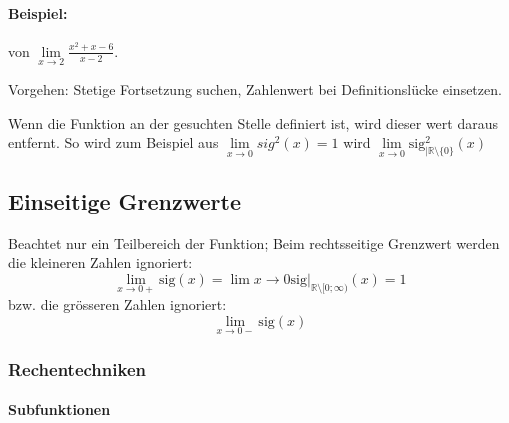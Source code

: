 \paragraph{Beispiel:} von $\lim\limits_{x \to 2}{\frac{x^2 + x -6}{x-2}}$.

Vorgehen: Stetige Fortsetzung suchen, Zahlenwert bei Definitionslücke  einsetzen.


Wenn die Funktion an der gesuchten Stelle definiert ist, wird dieser wert daraus entfernt. So wird zum Beispiel aus $\lim\limits_{x \to 0}{sig^2(x)} = 1$ wird $\lim\limits_{x \to 0}{\text{sig}^2_{|\mathbb{R} \setminus \{0\}}(x)}$

\subsection{Einseitige Grenzwerte}

	Beachtet nur ein Teilbereich der Funktion; Beim rechtsseitige Grenzwert werden die kleineren Zahlen ignoriert:
\[
	\lim\limits_{x \to 0+}{\text{sig}(x)} = \lim\limits{x \to 0} \text{sig}|_{\mathbb{R} \setminus [0;\infty)}(x) = 1
\]
bzw. die grösseren Zahlen ignoriert:
\[
	\lim\limits_{x \to 0-}{\text{sig}(x)}
\]

\subsubsection{Rechentechniken}

\paragraph{Subfunktionen}


